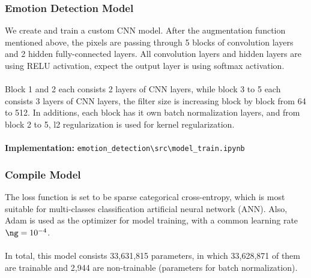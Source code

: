 \documentclass[11pt,a4paper]{article}
\begin{document}
    \subsubsection{Emotion Detection Model}
    We create and train a custom CNN model. After the augmentation function mentioned above, the pixels are passing through 5 blocks of convolution layers and 2 hidden fully-connected layers. All convolution layers and hidden layers  are using RELU activation, expect the output layer is using softmax activation. \\
    \\
    Block 1 and 2 each consists 2 layers of CNN layers, while block 3 to 5 each consists 3 layers of CNN layers, the filter size is increasing block by block from 64 to 512. In additions, each block has it own batch normalization layers, and from block 2 to 5, l2 regularization is used for kernel regularization. \\
    \\
    \textbf{Implementation:} \texttt{emotion\_detection\textbackslash src\textbackslash model\_train.ipynb}
    
    \subsubsection{Compile Model}
    The loss function is set to be sparse categorical cross-entropy, which is most suitable for multi-classes classification artificial neural network (ANN). Also, Adam is used as the optimizer for model training, with a common learning rate $\ng = 10^{-4}$. \\
    \\
    In total, this model consists 33,631,815 parameters, in which 33,628,871 of them are trainable and 2,944 are non-trainable (parameters for batch normalization).
    
\end{document}

